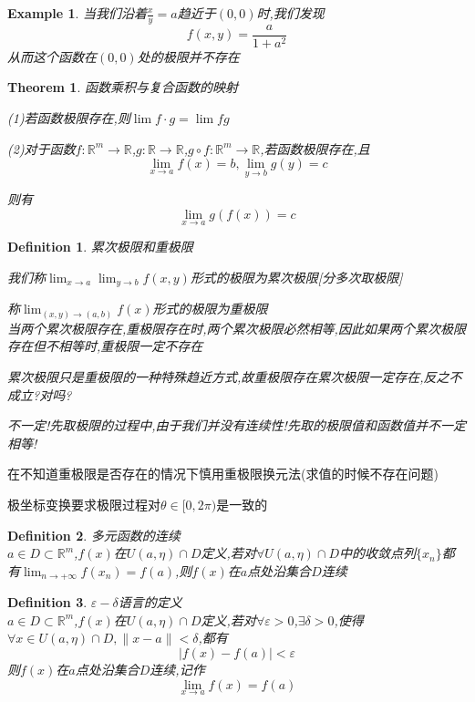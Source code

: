 \documentclass[11pt,hyperref,a4paper,UTF8]{ctexart}
\newtheorem{theorem}{Theorem}[subsection]
\newtheorem{example}{Example}[subsection]
\newtheorem{definition}{Definition}[subsection]
\newcommand{\RR}{\mathbb{R}}
\begin{document}
\begin{CJK}{UTF8}{gkai}
\begin{example}
  当我们沿着$\frac{x}{y} = a$趋近于$(0,0)$时,我们发现
  \[f(x,y) = \frac{a}{1 + a^2}\]
  从而这个函数在$(0,0)$处的极限并不存在
\end{example}

\begin{theorem}
  函数乘积与复合函数的映射

  (1)若函数极限存在,则$\lim f \cdot g = \lim f g$

  (2)对于函数$f: \RR^m \to \RR$,$g: \RR \to \RR$,$g \circ f: \RR^m \to \RR$,若函数极限存在,且
  \[\lim_{x\to a}f(x) = b,\lim_{y \to b}g(y) = c\]

  则有
  \[\lim_{x\to a}g(f(x)) = c\]
\end{theorem}

\begin{definition}
  累次极限和重极限

  我们称$\lim_{x \to a}\lim_{y \to b} f(x,y)$形式的极限为累次极限[分多次取极限]

  称$\lim_{(x,y)\to(a,b)}f(x)$形式的极限为重极限\\

  当两个累次极限存在,重极限存在时,两个累次极限必然相等,因此如果两个累次极限存在但不相等时,重极限一定不存在

  累次极限只是重极限的一种特殊趋近方式,故重极限存在累次极限一定存在,反之不成立?对吗?

  不一定!先取极限的过程中,由于我们并没有连续性!先取的极限值和函数值并不一定相等!
\end{definition}
在不知道重极限是否存在的情况下慎用重极限换元法(求值的时候不存在问题)

极坐标变换要求极限过程对$\theta \in [0,2\pi)$是一致的

\begin{definition}
  多元函数的连续\\

  $a \in D \subset \RR^m$,$f(x)$在$U(a,\eta)\cap D$定义,若对$\forall U(a,\eta)\cap D$中的收敛点列$\{x_n\}$都有$\lim_{n \to +\infty}f(x_n) = f(a)$,则$f(x)$在$a$点处沿集合$D$连续
\end{definition}

\begin{definition}
  $\varepsilon-\delta$语言的定义\\

  $a \in D \subset \RR^m$,$f(x)$在$U(a,\eta)\cap D$定义,若对$\forall \varepsilon >0$,$\exists \delta > 0$,使得$\forall x \in U(a,\eta)\cap D, \|x - a\| < \delta$,都有
  \[|f(x) - f(a)| < \varepsilon\]
  则$f(x)$在$a$点处沿集合$D$连续,记作
  \[\lim_{x \to a}f(x) = f(a)\]
\end{definition}


\end{CJK}
\end{document}
